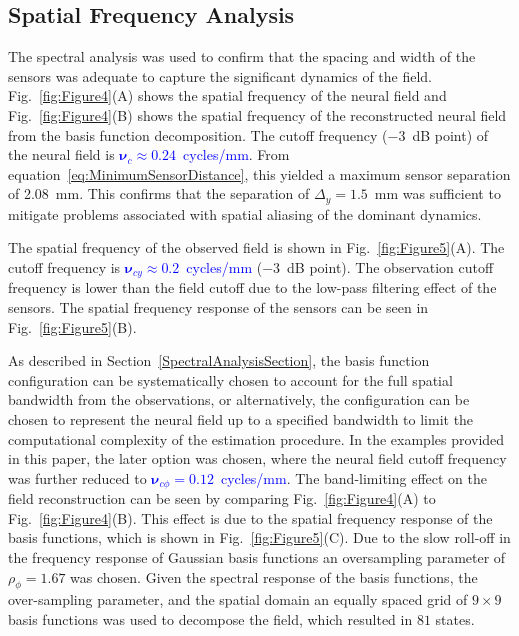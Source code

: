 \documentclass[review,authoryear,3p]{elsarticle}
\newcommand{\parham}[1]{\textcolor{blue}{#1}}
\begin{document}
\subsection{Spatial Frequency Analysis}
The spectral analysis was used to confirm that the spacing and width of the sensors was adequate to capture the significant dynamics of the field. Fig.~\ref{fig:Figure4}(A) shows the spatial frequency of the neural field and Fig.~\ref{fig:Figure4}(B) shows the spatial frequency of the reconstructed neural field from the basis function decomposition. The cutoff frequency ($-3$~dB point) of the neural field is \parham{$\boldsymbol{\nu}_c \approx 0.24$~cycles/mm}. From equation~\ref{eq:MinimumSensorDistance}, this yielded a maximum sensor separation of 2.08~mm. This confirms that the separation of $\Delta_{y} = 1.5$~mm was sufficient to mitigate problems associated with spatial aliasing of the dominant dynamics.

The spatial frequency of the observed field is shown in Fig.~\ref{fig:Figure5}(A). The cutoff frequency is \parham{$\boldsymbol{\nu}_{cy} \approx 0.2$~cycles/mm} ($-3$~dB point). The observation cutoff frequency is lower than the field cutoff due to the low-pass filtering effect of the sensors. The spatial frequency response of the sensors can be seen in Fig.~\ref{fig:Figure5}(B). 

As described in Section~\ref{SpectralAnalysisSection}, the basis function configuration can be systematically chosen to account for the full spatial bandwidth from the observations, or alternatively, the configuration can be chosen to represent the neural field up to a specified bandwidth to limit the computational complexity of the estimation procedure. In the examples provided in this paper, the later option was chosen, where the neural field cutoff frequency was further reduced to \parham{$\boldsymbol{\nu}_{c\phi} = 0.12$~cycles/mm}. The band-limiting effect on the field reconstruction can be seen by comparing Fig.~\ref{fig:Figure4}(A) to Fig.~\ref{fig:Figure4}(B). This effect is due to the spatial frequency response of the basis functions, which is shown in Fig.~\ref{fig:Figure5}(C). Due to the slow roll-off in the frequency response of Gaussian basis functions an oversampling parameter of $\rho_{\phi} = 1.67$ was chosen. Given the spectral response of the basis functions, the over-sampling parameter, and the spatial domain an equally spaced grid of $9\times9$ basis functions was used to decompose the field, which resulted in $81$ states. 
\end{document}
